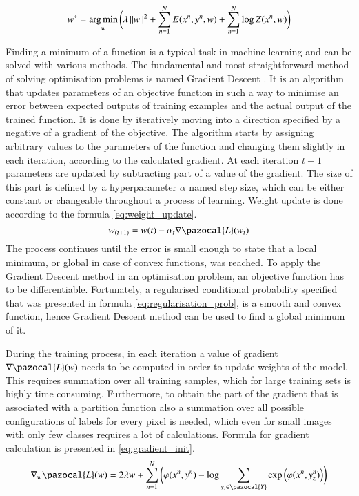 \begin{equation}
    \label{eq:regularisation}
    w^* = \operatorname*{arg\,min}_{w}{\bigg(\lambda \left \| w \right \|^2 + \sum_{n=1}^{N}{E(x^n,y^n,w)} + \sum_{n=1}^{N}{\log{Z}(x^n,w)}\bigg)}
\end{equation}

Finding a minimum of a function is a typical task in machine learning and can be solved with various methods. The fundamental and most straightforward method of solving optimisation problems is named Gradient Descent \cite{optimisation_deep_learning}. It is an algorithm that updates parameters of an objective function in such a way to minimise an error between expected outputs of training examples and the actual output of the trained function. It is done by iteratively moving into a direction specified by a negative of a gradient of the objective. The algorithm starts by assigning arbitrary values to the parameters of the function and changing them slightly in each iteration, according to the calculated gradient. At each iteration $t+1$ parameters are updated by subtracting part of a value of the gradient. The size of this part is defined by a hyperparameter $\alpha$ named step size, which can be either constant or changeable throughout a process of learning. Weight update is done according to the formula \ref{eq:weight_update}.
\begin{equation}
    \label{eq:weight_update}
    w_{(t+1)} = w(t) - \alpha_t \nabla \pazocal{L}(w_t)
\end{equation}
The process continues until the error is small enough to state that a local minimum, or global in case of convex functions, was reached. To apply the Gradient Descent method in an optimisation problem, an objective function has to be differentiable. Fortunately, a regularised conditional probability specified that was presented in formula \ref{eq:regularisation_prob}, is a smooth and convex function, hence Gradient Descent method can be used to find a global minimum of it.

During the training process, in each iteration a value of gradient $\nabla \pazocal{L}(w)$ needs to be computed in order to update weights of the model. This requires summation over all training samples, which for large training sets is highly time consuming. Furthermore, to obtain the part of the gradient that is associated with a partition function also a summation over all possible configurations of labels for every pixel is needed, which even for small images with only few classes requires a lot of calculations. Formula for gradient calculation is presented in \ref{eq:gradient_init}.
\begin{equation}
    \label{eq:gradient_init}
    \nabla_w\pazocal{L}(w) = 2\lambda w + 
    \sum_{n=1}^{N}{ \bigg( \varphi(x^n,y^n) -
    \log{\sum_{y_z \in \pazocal{Y}}{\exp \Big( \varphi(x^n,y_{z}^{n}) \Big) }} \bigg)}
\end{equation}

